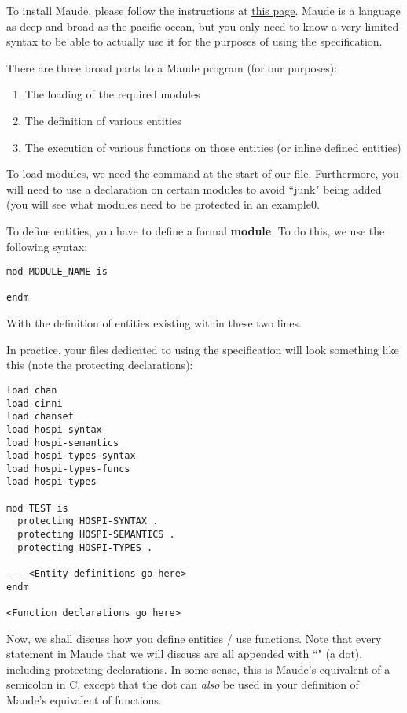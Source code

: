 To install Maude, please follow the instructions at \href{http://maude.cs.illinois.edu/w/index.php/Maude_download_and_installation}{this page}.
Maude is a language as deep and broad as the pacific ocean, but you only need to know a very limited syntax to be able to actually use it for the purposes of using the specification.

There are three broad parts to a Maude program (for our purposes):
\begin{enumerate}
    \item The loading of the required modules
    \item The definition of various entities 
    \item The execution of various functions on those entities (or inline defined entities)
\end{enumerate}

To load modules, we need the  command at the start of our file. Furthermore, you will need to use a  declaration on certain modules to avoid ``junk" being added (you will see what modules need to be protected in an example0.

To define entities, you have to define a formal \textbf{module}. To do this, we use the following syntax:

\begin{verbatim}
mod MODULE_NAME is

endm
\end{verbatim}
With the definition of entities existing within these two lines.

In practice, your files dedicated to using the specification will look something like this (note the protecting declarations):
\begin{verbatim}
load chan
load cinni
load chanset
load hospi-syntax
load hospi-semantics
load hospi-types-syntax
load hospi-types-funcs
load hospi-types

mod TEST is
  protecting HOSPI-SYNTAX .
  protecting HOSPI-SEMANTICS .
  protecting HOSPI-TYPES .

--- <Entity definitions go here>
endm

<Function declarations go here>

\end{verbatim}

Now, we shall discuss how you define entities / use functions. Note that every statement in Maude that we will discuss are all appended with ``" (a dot), including protecting declarations. In some sense, this is Maude's equivalent of a semicolon in C, except that the dot can \textit{also} be used in your definition of Maude's equivalent of functions.

